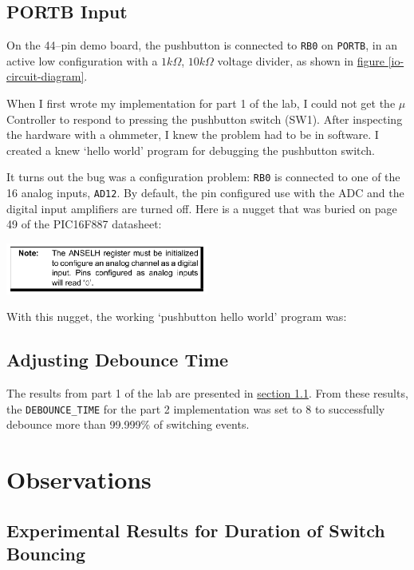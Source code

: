 \documentclass[11pt]{article}
\begin{document}
\clearpage
\subsection{PORTB Input}

On the 44--pin demo board, the pushbutton is connected to \texttt{RB0}
on \texttt{PORTB}, in an active low configuration with a $1k\Omega$, $10k\Omega$
voltage divider, as shown in \hyperref[io-circuit-diagram]{figure \ref{io-circuit-diagram}}.

When I first wrote my implementation for part 1 of the lab,
I could not get the $\mu$Controller to respond to pressing the
pushbutton switch (SW1). After inspecting the hardware with a ohmmeter,
I knew the problem had to be in software. I created a knew `hello world'
program for debugging the pushbutton switch.

It turns out the bug was a configuration problem: \texttt{RB0} is connected
to one of the 16 analog inputs, \texttt{AD12}. By default, the pin configured
use with the ADC and the digital input amplifiers are turned off.
Here is a nugget that was buried on page 49 of the PIC16F887 datasheet:
\begin{center}
	\includegraphics[width=0.5\textwidth]{Figures/port-b-configuration-note.pdf}
\end{center}
With this nugget, the working `pushbutton hello world' program was:


\subsection{Adjusting Debounce Time}

The results from part 1 of the lab are presented in
\hyperref[part-1-results-section]{section \ref{part-1-results-section}}.
From these results, the \texttt{DEBOUNCE\_TIME} for the part 2 implementation
was set to 8 to successfully debounce more than 99.999\% of switching events.

\section{Observations}
\subsection{Experimental Results for Duration of Switch Bouncing}
\label{part-1-results-section}
\end{document}
